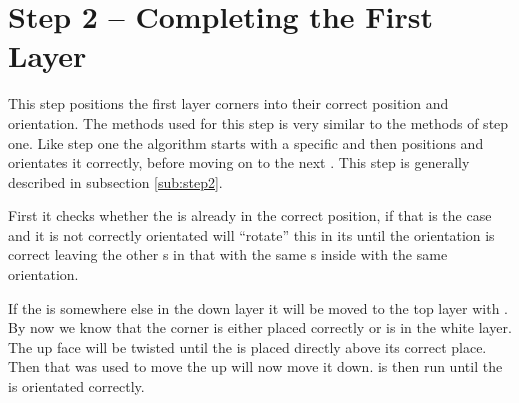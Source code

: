 \section{Step 2 -- Completing the First Layer}
This step positions the first layer corners into their correct position and orientation. The methods used for this step is very similar to the methods of step one. 
Like step one the algorithm starts with a specific \cpiece{} and then positions and orientates it correctly, before moving on to the next \cpiece. 
This step is generally described in subsection \ref{sub:step2}.

First it checks whether the \cubie{} is already in the correct position, if that is the case and it is not correctly orientated  will ``rotate'' this \cpiece{} in its \cubicle{} until the orientation is correct leaving the other \cubicle{}s in that \face{} with the same \cubie{}s inside with the same orientation. 

If the \cpiece{} is somewhere else in the down layer it will be moved to the top layer with . 
By now we know that the corner \cpiece{} is either placed correctly or is in the white layer. 
The up face will be twisted until the \cpiece{} is placed directly above its correct place. 
Then  that was used to move the \cpiece{} up will now move it down. 
 is then run until the \cpiece{} is orientated correctly.